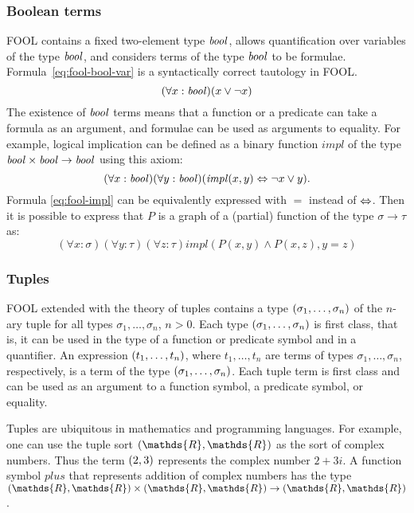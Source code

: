 \documentclass{easychair}
\begin{document}
\subsubsection*{Boolean terms}
FOOL contains a fixed two-element type $\mathit{bool}$, allows quantification over 
variables of the type $\mathit{bool}$, and considers terms of the type $\mathit{bool}$ to be
formulae. Formula~\ref{eq:fool-bool-var} is a syntactically correct tautology
in FOOL.
\begin{equation}\label{eq:fool-bool-var}
(\forall x:\mathit{bool})(x \lor \neg x)
\end{equation}
The existence of $\mathit{bool}$ terms means that a function or a predicate can take 
a formula as an argument, and formulae can be used as arguments to equality.
For example, logical implication can be defined as a binary function
$\mathit{impl}$ of the type $\mathit{bool} \times \mathit{bool} \to \mathit{bool}$ using this axiom:
\begin{equation}\label{eq:fool-impl}
(\forall x:\mathit{bool})(\forall y:\mathit{bool})(\mathit{impl}(x,y) \Leftrightarrow \neg x \lor y).
\end{equation}
Formula \ref{eq:fool-impl} can be equivalently expressed with $=$ instead of
$\Leftrightarrow$.
Then it is possible to express that $P$ is a graph of a (partial) function of 
the type $\sigma \to \tau$ as:
\begin{equation}\label{eq:bool-arg-example}
(\forall x:\sigma)(\forall y:\tau)(\forall z:\tau)
\mathit{impl}(P(x,y) \land P(x,z), y = z)
\end{equation}

\subsubsection*{Tuples}
FOOL extended with the theory of tuples contains a type
$({\sigma_1,\ldots,\sigma_n})$ of the $n$-ary tuple for all types
$\sigma_1,\ldots,\sigma_n$, $n>0$. Each type
$({\sigma_1,\ldots,\sigma_n})$ is first class, that is, it can be
used in the type of a function or predicate symbol and in a
quantifier. An expression $({t_1,\ldots,t_n})$, where $t_1,\ldots,t_n$ are
terms of types $\sigma_1,\ldots,\sigma_n$, respectively, is a term of the type
$({\sigma_1,\ldots,\sigma_n})$. Each tuple term is first class and can be used as an argument to a function symbol, a predicate symbol, or equality.

Tuples are ubiquitous in mathematics and programming languages. For example,
one can use the tuple sort $\tuple{\mathds{R},\mathds{R}}$ as the sort of
complex numbers. 
Thus the term $({2,3})$ represents the complex number $2+3i$. 
A function symbol $\mathit{plus}$ that represents addition of complex numbers 
has the type $\tuple{\mathds{R},\mathds{R}} \times 
\tuple{\mathds{R},\mathds{R}} \to \tuple{\mathds{R},\mathds{R}}$.
\end{document}
